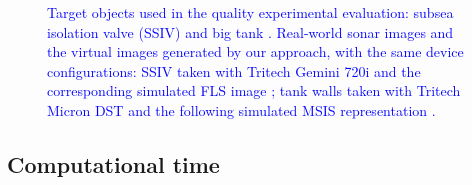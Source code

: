 \documentclass[final,5p,times]{elsarticle}
\begin{document}
\begin{figure}[!ht]
{        \label{fig:eval:tank:real}
    }
    \setcounter{subfigure}{2}
    \setcounter{subfigure}{5}
    \captionsetup{justification=justified}
    \caption{\textcolor{blue}{Target objects used in the quality experimental evaluation: subsea isolation valve (SSIV)  and big tank . Real-world sonar images and the virtual images generated by our approach, with the same device configurations: SSIV taken with Tritech Gemini 720i  and the corresponding simulated FLS image ; tank walls taken with Tritech Micron DST  and the following simulated MSIS representation .}}
    \label{fig:eval}
\end{figure}

\subsection{Computational time}
\end{document}
